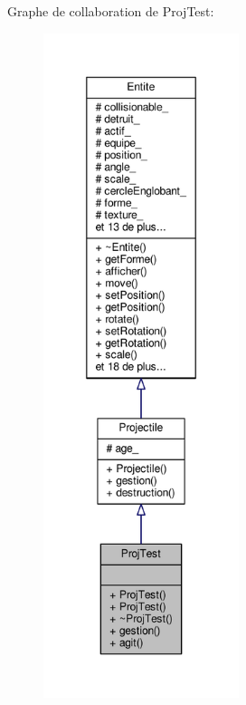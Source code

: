 Graphe de collaboration de Proj\+Test\+:\nopagebreak
\begin{figure}[H]
\begin{center}
\leavevmode
\includegraphics[height=550pt]{class_proj_test__coll__graph}
\end{center}
\end{figure}
